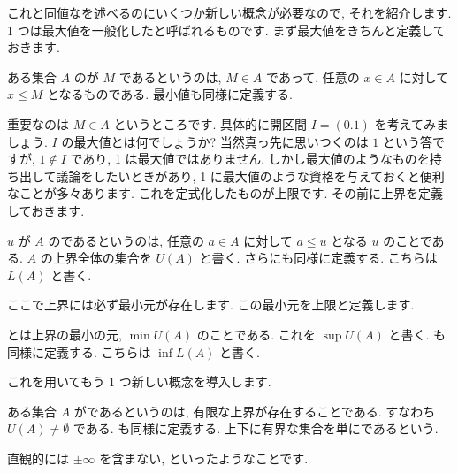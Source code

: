 \documentclass[openany, a4paper, oneside]{jsbook}
\begin{document}
これと同値なを述べるのにいくつか新しい概念が必要なので, それを紹介します.
1 つは最大値を一般化したと呼ばれるものです.
まず最大値をきちんと定義しておきます.
\begin{defn}
ある集合 $A$ のが $M$ であるというのは,  $M\in A$ であって,
任意の $x\in A$ に対して $x\leq M$ となるものである. 最小値も同様に定義する.
\end{defn}
重要なのは $M\in A$ というところです.
具体的に開区間 $I=(0.1)$ を考えてみましょう.
 $I$ の最大値とは何でしょうか?
当然真っ先に思いつくのは $1$ という答ですが,  $1\notin I$ であり, 1 は最大値ではありません.
しかし最大値のようなものを持ち出して議論をしたいときがあり,
1 に最大値のような資格を与えておくと便利なことが多々あります.
これを定式化したものが上限です.
その前に上界を定義しておきます.
\begin{defn}
$u$ が $A$ のであるというのは, 任意の $a\in A$ に対して $a\leq u$ となる $u$ のことである.
$A$ の上界全体の集合を $U (A)$ と書く.
さらにも同様に定義する. こちらは $L (A)$ と書く.
\end{defn}
ここで上界には必ず最小元が存在します.
この最小元を上限と定義します.
\begin{defn}
とは上界の最小の元,  $\min U (A)$ のことである.
これを $\sup U (A)$ と書く.
も同様に定義する. こちらは $\inf L (A)$ と書く.
\end{defn}
これを用いてもう 1 つ新しい概念を導入します.
\begin{defn}
ある集合 $A$ がであるというのは, 有限な上界が存在することである.
すなわち $U (A)\not=\emptyset$ である. も同様に定義する.
上下に有界な集合を単にであるという.
\end{defn}
直観的には $\pm\infty$ を含まない, といったようなことです.
\end{document}
